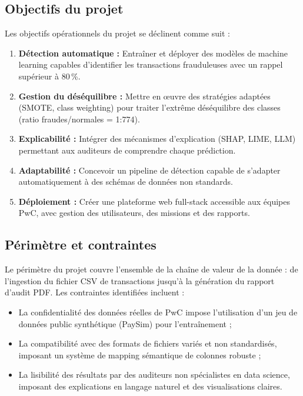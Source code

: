 \documentclass[12pt,a4paper,twoside]{report}
\theoremstyle{definition}
\begin{document}
\subsection{Objectifs du projet}

Les objectifs opérationnels du projet se déclinent comme suit :

\begin{enumerate}[label=\textbf{O\arabic*.}]
  \item \textbf{Détection automatique :} Entraîner et déployer des modèles de
    machine learning capables d'identifier les transactions frauduleuses avec un
    rappel supérieur à 80\,\%.
  \item \textbf{Gestion du déséquilibre :} Mettre en œuvre des stratégies adaptées
    (SMOTE, class weighting) pour traiter l'extrême déséquilibre des classes
    (ratio fraudes/normales = 1:774).
  \item \textbf{Explicabilité :} Intégrer des mécanismes d'explication (SHAP, LIME,
    LLM) permettant aux auditeurs de comprendre chaque prédiction.
  \item \textbf{Adaptabilité :} Concevoir un pipeline de détection capable de
    s'adapter automatiquement à des schémas de données non standards.
  \item \textbf{Déploiement :} Créer une plateforme web full-stack accessible aux
    équipes PwC, avec gestion des utilisateurs, des missions et des rapports.
\end{enumerate}

\subsection{Périmètre et contraintes}

Le périmètre du projet couvre l'ensemble de la chaîne de valeur de la donnée :
de l'ingestion du fichier CSV de transactions jusqu'à la génération du rapport
d'audit PDF. Les contraintes identifiées incluent :
\begin{itemize}
  \item La confidentialité des données réelles de PwC impose l'utilisation d'un
    jeu de données public synthétique (PaySim) pour l'entraînement ;
  \item La compatibilité avec des formats de fichiers variés et non standardisés,
    imposant un système de mapping sémantique de colonnes robuste ;
  \item La lisibilité des résultats par des auditeurs non spécialistes en data science,
    imposant des explications en langage naturel et des visualisations claires.
\end{itemize}
\end{document}
